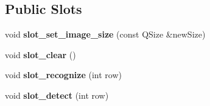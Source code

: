 \subsection*{Public Slots}
\begin{DoxyCompactItemize}
\item 
\mbox{\label{classFMainFacecopeModel_aa2377ed7d59faa527c01161500c1a18d}} 
void {\bfseries slot\+\_\+set\+\_\+image\+\_\+size} (const Q\+Size \&new\+Size)
\item 
\mbox{\label{classFMainFacecopeModel_a8c639e2873a4e433b30575d8cfc1d660}} 
void {\bfseries slot\+\_\+clear} ()
\item 
\mbox{\label{classFMainFacecopeModel_abba3d83f3b85760d28d5c878ce646e7c}} 
void {\bfseries slot\+\_\+recognize} (int row)
\item 
\mbox{\label{classFMainFacecopeModel_a22d8ffec6b8cdafa8cea02032dfd0203}} 
void {\bfseries slot\+\_\+detect} (int row)
\end{DoxyCompactItemize}
